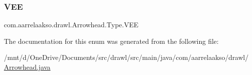 \subsubsection{\texorpdfstring{V\+EE}{VEE}}
{\footnotesize\ttfamily com.\+aarrelaakso.\+drawl.\+Arrowhead.\+Type.\+V\+EE}



The documentation for this enum was generated from the following file\+:\begin{DoxyCompactItemize}
\item 
/mnt/d/\+One\+Drive/\+Documents/src/drawl/src/main/java/com/aarrelaakso/drawl/\hyperlink{_arrowhead_8java}{Arrowhead.\+java}\end{DoxyCompactItemize}

